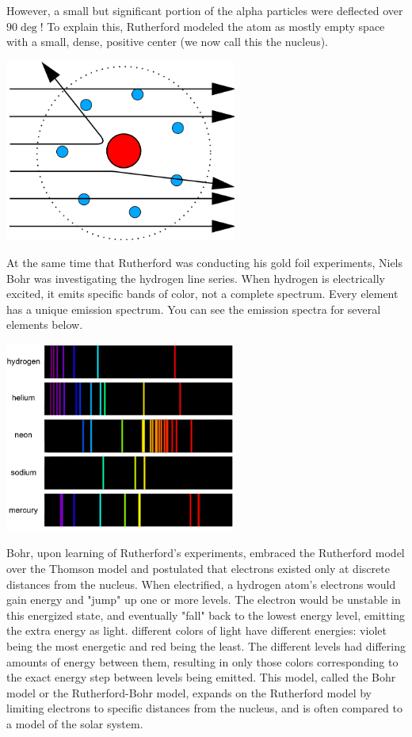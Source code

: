 However, a small but significant portion of the alpha particles were deflected
over $90 \deg$! To explain this, Rutherford modeled the atom as mostly empty
space with a small, dense, positive center (we now call this the nucleus).

\begin{center}
\includegraphics[width=3in]{rutherford_gold.png}
\end{center}

At the same time that Rutherford was conducting his gold foil experiments, Niels
Bohr was investigating the hydrogen line series. When hydrogen is electrically 
excited, it emits specific bands of color, not a complete spectrum. Every 
element has a unique emission spectrum. You can see the emission spectra for 
several elements below. 

\begin{center}
\noindent\includegraphics[width=3in]{spectral_lines.png}
\end{center}

Bohr, upon learning of Rutherford's experiments, embraced the Rutherford model 
over the Thomson model and postulated that electrons existed only at discrete 
distances from the nucleus. When electrified, a hydrogen atom's electrons 
would gain energy and "jump" up one or more levels. The electron would be 
unstable in this energized state, and eventually "fall" back to the lowest 
energy level, emitting the extra energy as light. different colors of light 
have different energies: violet being the most energetic and red being the 
least. The different levels had differing amounts of energy between them, 
resulting in only those colors corresponding to the exact energy step between 
levels being emitted. This model, called the Bohr model or the Rutherford-Bohr 
model, expands on the Rutherford model by limiting electrons to specific 
distances from the nucleus, and is often compared to a model of the solar 
system.

